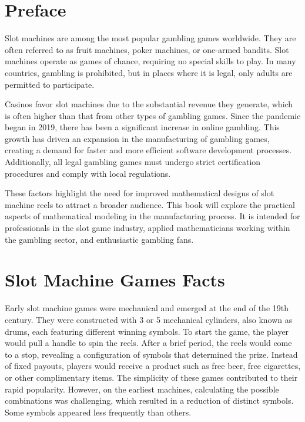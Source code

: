 \documentclass[12pt,twoside,openany]{book}
\begin{document}
\mainmatter

\pagestyle{fancy}

\chapter*{Preface}

Slot machines are among the most popular gambling games worldwide. They are often referred to as fruit machines, poker machines, or one-armed bandits. Slot machines operate as games of chance, requiring no special skills to play. In many countries, gambling is prohibited, but in places where it is legal, only adults are permitted to participate.

Casinos favor slot machines due to the substantial revenue they generate, which is often higher than that from other types of gambling games. Since the pandemic began in 2019, there has been a significant increase in online gambling. This growth has driven an expansion in the manufacturing of gambling games, creating a demand for faster and more efficient software development processes. Additionally, all legal gambling games must undergo strict certification procedures and comply with local regulations.

These factors highlight the need for improved mathematical designs of slot machine reels to attract a broader audience. This book will explore the practical aspects of mathematical modeling in the manufacturing process. It is intended for professionals in the slot game industry, applied mathematicians working within the gambling sector, and enthusiastic gambling fans.

\chapter{Slot Machine Games Facts}

Early slot machine games were mechanical and emerged at the end of the 19th century. They were constructed with 3 or 5 mechanical cylinders, also known as drums, each featuring different winning symbols. To start the game, the player would pull a handle to spin the reels. After a brief period, the reels would come to a stop, revealing a configuration of symbols that determined the prize. Instead of fixed payouts, players would receive a product such as free beer, free cigarettes, or other complimentary items. The simplicity of these games contributed to their rapid popularity. However, on the earliest machines, calculating the possible combinations was challenging, which resulted in a reduction of distinct symbols. Some symbols appeared less frequently than others.
\end{document}
